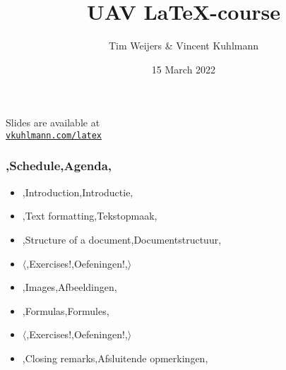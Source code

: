 \documentclass{../../cursuspresentatie}
\title{UAV \LaTeX{}-course}
\author{Tim Weijers \& Vincent Kuhlmann}
\date{15 March 2022}
\begin{document}

\begin{frame}
	\titlepage
	\centering

	Slides are available at\\
	\href{https://vkuhlmann.com/latex}{\ul{\texttt{vkuhlmann.com/latex}}}
\end{frame}

\begin{frame}
	\frametitle{\lang,Schedule,Agenda,}
	
	\begin{itemize}
		\item \lang,Introduction,Introductie,
		\item \lang,Text formatting,Tekstopmaak,
		\item \lang,Structure of a document,Documentstructuur,
		\item $ \langle $\lang,Exercises!,Oefeningen!,$ \rangle $
		\item \lang,Images,Afbeeldingen,
		\item \lang,Formulas,Formules,
		\item $ \mathbf\langle $\lang,Exercises!,Oefeningen!,$ \rangle $
		\item \lang,Closing remarks,Afsluitende opmerkingen,
	\end{itemize}
\end{frame}











% 


	
\end{document}
